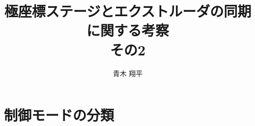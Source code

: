 \documentclass[twocolumn,oneside,a4paper]{article}
\title{極座標ステージとエクストルーダの同期に関する考察 \\その2}
\author{青木 翔平}
\begin{document}
\maketitle

\section{制御モードの分類}










%
\end{document}
